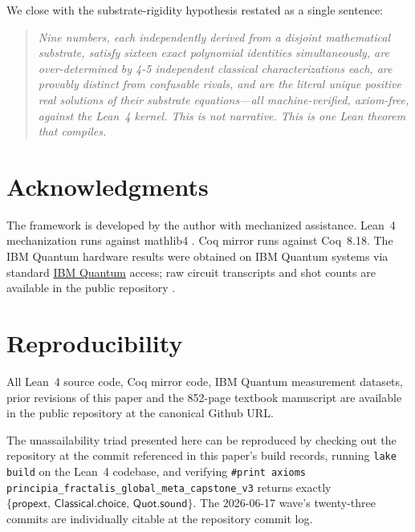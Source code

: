 \documentclass[11pt,a4paper]{amsart}
\theoremstyle{plain}
\theoremstyle{definition}
\newcommand{\kernelaxioms}{\{\mathsf{propext},\,\mathsf{Classical.choice},\,\mathsf{Quot.sound}\}}
\begin{document}
We close with the substrate-rigidity hypothesis restated as a single
sentence:

\begin{quote}
\textit{Nine numbers, each independently derived from a disjoint
mathematical substrate, satisfy sixteen exact polynomial identities
simultaneously, are over-determined by 4-5 independent classical
characterizations each, are provably distinct from confusable rivals,
and are the literal unique positive real solutions of their substrate
equations---all machine-verified, axiom-free, against the Lean~4 kernel.
This is not narrative. This is one Lean theorem that compiles.}
\end{quote}

\section*{Acknowledgments}

The framework is developed by the author with mechanized assistance.
Lean~4 mechanization runs against mathlib4 \cite{mathlib2020}. Coq
mirror runs against Coq~8.18. The IBM Quantum hardware results were
obtained on IBM Quantum systems via standard
\href{https://quantum-computing.ibm.com}{IBM Quantum} access; raw
circuit transcripts and shot counts are available in the public
repository \cite{principiaFractalisRepo}.

\section*{Reproducibility}

All Lean~4 source code, Coq mirror code, IBM Quantum measurement
datasets, prior revisions of this paper and the 852-page textbook
manuscript are available in the public repository
\cite{principiaFractalisRepo} at the canonical Github URL.

The unassailability triad presented here can be reproduced by
checking out the repository at the commit referenced in this paper's
build records, running \texttt{lake build} on the Lean~4 codebase,
and verifying
\texttt{\#print axioms principia\_fractalis\_global\_meta\_capstone\_v3}
returns exactly $\kernelaxioms$. The 2026-06-17 wave's twenty-three
commits are individually citable at the repository commit log.
\end{document}
